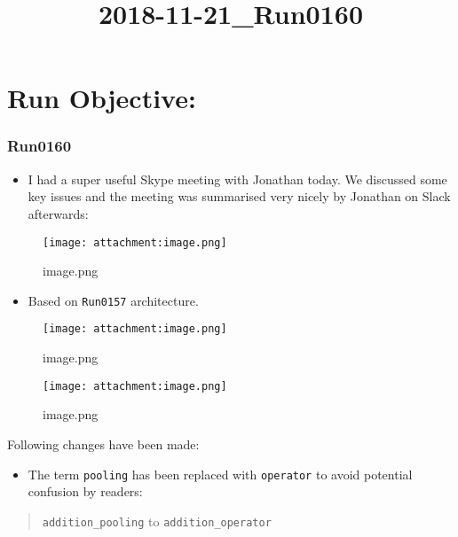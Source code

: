 \documentclass[11pt]{article}
\title{2018-11-21\_Run0160}
\makeatletter
\def\maxwidth{\ifdim\Gin@nat@width>\linewidth\linewidth
    \else\Gin@nat@width\fi}
\let\Oldincludegraphics\includegraphics
\renewcommand{\includegraphics}[1]{\Oldincludegraphics[width=.8\maxwidth]{#1}}
\providecommand{\tightlist}{%
      \setlength{\itemsep}{0pt}\setlength{\parskip}{0pt}}
\makeatother
\begin{document}
    
    
    \maketitle
    
    

    
    \hypertarget{run-objective}{%
\section{Run Objective:}\label{run-objective}}

    \hypertarget{run0160}{%
\subsubsection{Run0160}\label{run0160}}

\begin{itemize}
\tightlist
\item
  I had a super useful Skype meeting with Jonathan today. We discussed
  some key issues and the meeting was summarised very nicely by Jonathan
  on Slack afterwards:
\end{itemize}

\begin{figure}
\centering
\texttt{[image: attachment:image.png]}
\caption{image.png}
\end{figure}

    \begin{itemize}
\tightlist
\item
  Based on \texttt{Run0157} architecture.
\end{itemize}

\begin{figure}
\centering
\texttt{[image: attachment:image.png]}
\caption{image.png}
\end{figure}

    \begin{figure}
\centering
\texttt{[image: attachment:image.png]}
\caption{image.png}
\end{figure}

    Following changes have been made:

\begin{itemize}
\tightlist
\item
  The term \texttt{pooling} has been replaced with \texttt{operator} to
  avoid potential confusion by readers:
\end{itemize}

\begin{quote}
\texttt{addition\_pooling} to \texttt{addition\_operator}
\end{quote}
\end{document}
